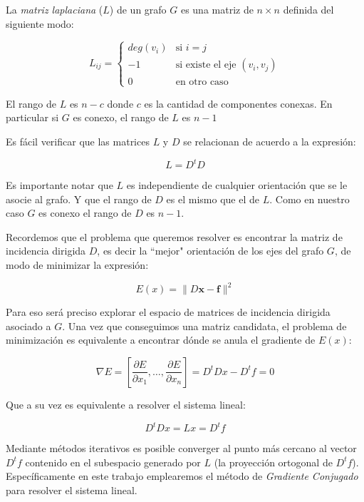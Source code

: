 \documentclass[conference,compsoc,a4paper]{IEEEtran}
\begin{document}

La \textit{matriz laplaciana} ($L$) de un grafo $G$ es una matriz de 
$n \times n$ definida del siguiente modo:

$$
	L_{ij} =
	\begin{cases}
	deg(v_i) & \text{si $i = j$} \\
	-1 & \text{si existe el eje $(v_i,v_j)$} \\
	0 & \text{en otro caso} 
	\end{cases}
$$

El rango de $L$ es $n-c$ donde $c$ es la cantidad de componentes 
conexas. En particular si $G$ es conexo, el rango de $L$ es $n-1$

\bigskip


Es fácil verificar que las matrices $L$ y $D$ se relacionan de acuerdo
a la expresión:

$$L = D^t D$$

Es importante notar que $L$ es independiente de cualquier orientación 
que se le asocie al grafo. Y que el rango de $D$ es el mismo que el de 
$L$. Como en nuestro caso $G$ es conexo el rango de $D$ es $n-1$.

\bigskip


Recordemos que el problema que queremos resolver es encontrar la matriz 
de incidencia dirigida $D$, es decir la ``mejor" orientación de los ejes 
del grafo $G$, de modo de minimizar la expresión:

$$E(x) = \|D\bm{x}-\bm{f}\|^2$$

Para eso será preciso explorar el espacio de matrices de 
incidencia dirigida asociado a $G$. Una vez que conseguimos una 
matriz candidata, el problema de minimización es equivalente a encontrar
dónde se anula el gradiente de $E(x)$:
 
$$\nabla E = [\frac{\partial E}{\partial x_1}, \dots, \frac{\partial 
E}{\partial x_n}] = D^tDx-D^tf=0$$

Que a su vez es equivalente a resolver el sistema lineal:

$$D^tDx = Lx = D^tf$$

Mediante métodos iterativos es posible converger al punto más cercano 
al vector $D^tf$ contenido en el subespacio generado por $L$ (la 
proyección ortogonal de $D^tf$). Específicamente en este trabajo 
emplearemos el método de \textit{Gradiente Conjugado} \cite{Saad:2007} 
para resolver el sistema lineal.
\end{document}
